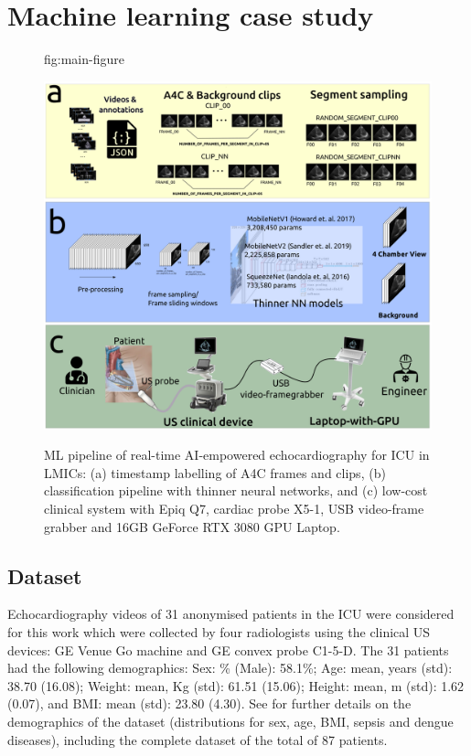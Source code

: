 \documentclass[mlabstract,twocolumn]{jmlr}
\begin{document}
\section{Machine learning case study}
\begin{figure}[t]%
\floatconts
  {fig:main-figure}
  {\caption{
      ML pipeline of real-time AI-empowered echocardiography for ICU in LMICs:
      (a) timestamp labelling of A4C frames and clips,
      (b) classification pipeline with thinner neural networks, and
      (c) low-cost clinical system with Epiq Q7, cardiac probe X5-1, USB video-frame grabber and 16GB GeForce RTX 3080 GPU Laptop.
    }
  }
  {\includegraphics[width=0.85\linewidth]{../figures/main-figure/versions/drawing-v03}}%
\end{figure}
\subsection{Dataset}
Echocardiography videos of 31 anonymised patients in the ICU were considered for this work which were collected by four radiologists using the clinical US devices: GE Venue Go machine and GE convex probe C1-5-D.
The 31 patients had the following demographics:
Sex: \% (Male): 58.1\%;
Age: mean, years (std): 38.70 (16.08);
Weight: mean, Kg (std): 61.51 (15.06);
Height: mean, m (std): 1.62 (0.07), and 
BMI: mean (std): 23.80 (4.30).
See  for further details on the demographics of the dataset (distributions for sex, age, BMI, sepsis and dengue diseases), including the complete dataset of the total of 87 patients.
\end{document}
